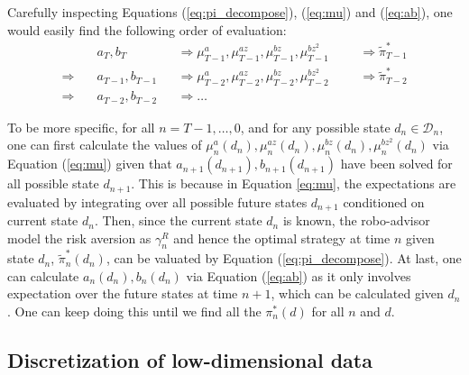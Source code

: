 Carefully inspecting Equations (\ref{eq:pi_decompose}), (\ref{eq:mu}) and (\ref{eq:ab}), one would easily find the following order of evaluation:\begin{equation}\label{eq:order}\begin{aligned}
    &a_T,b_T&&\Rightarrow \mu_{T-1}^{a}, \mu_{T-1}^{az}, \mu_{T-1}^{bz}, \mu_{T-1}^{bz^2}&&&\Rightarrow\tilde\pi_{T-1}^*\\
    \Rightarrow\quad&a_{T-1},b_{T-1}&&\Rightarrow\mu_{T-2}^{a}, \mu_{T-2}^{az}, \mu_{T-2}^{bz}, \mu_{T-2}^{bz^2}&&&\Rightarrow\tilde\pi_{T-2}^*\\
    \Rightarrow\quad&a_{T-2},b_{T-2}&&\Rightarrow\ldots
\end{aligned}
\end{equation}

To be more specific, for all $n=T-1,\ldots,0$, and for any possible state $d_n\in\mathcal D_n$, one can first calculate the values of $\mu_{n}^{a}(d_n), \mu_{n}^{az}(d_n), \mu_{n}^{bz}(d_n), \mu_{n}^{bz^2}(d_n)$ via Equation (\ref{eq:mu}) given that $a_{n+1}(d_{n+1}),b_{n+1}(d_{n+1})$ have been solved for all possible state $d_{n+1}$. This is because in Equation \ref{eq:mu}, the expectations are evaluated by integrating over all possible future states $d_{n+1}$ conditioned on current state $d_n$. Then, since the current state $d_n$ is known, the robo-advisor model the risk aversion as $\gamma_n^R$ and hence the optimal strategy at time $n$ given state $d_n$, $\tilde\pi_n^*(d_n)$, can be valuated by Equation (\ref{eq:pi_decompose}). At last, one can calculate $a_n(d_n),b_n(d_n)$ via Equation (\ref{eq:ab}) as it only involves expectation over the future states at time $n+1$, which can be calculated given $d_n$. One can keep doing this until we find all the $\pi_n^*(d) $ for all $n$ and $d$.

\subsection{Discretization of low-dimensional data}

